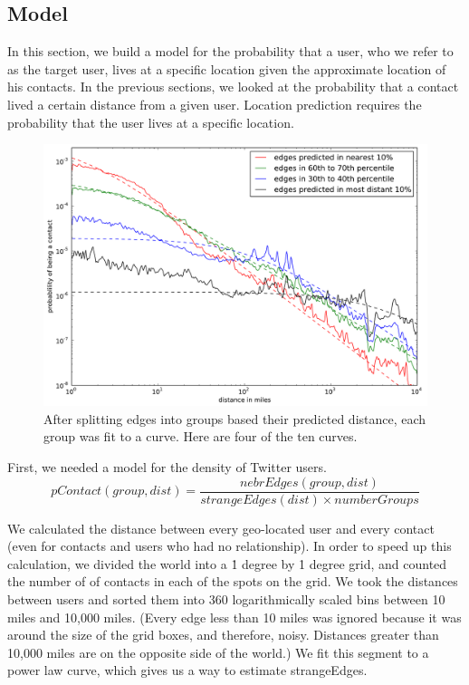 \subsection{Model}
\label{sec:model}

In this section, we build a model for the probability that a user, who we refer
to as the target user, lives at a specific location given the approximate
location of his contacts.
%
In the previous sections, we looked at the probability that a contact lived a
certain distance from a given user.
%
Location prediction requires the probability that the user lives at a specific
location.


\begin{figure}[tb]
\centering
\includegraphics[width=\linewidth]{figures/near_prob_fit.pdf}
\caption{
After splitting edges into groups based their predicted distance, each group was fit to a curve. Here are four of the ten curves.
}
\label{fig:NearProbFit}
\end{figure}

First, we needed a model for the density of Twitter users.
\[
    pContact(group,dist) = \frac{nebrEdges(group,dist)}{strangeEdges(dist) \times numberGroups}
\]

We calculated the distance between every geo-located user and every contact
(even for contacts and users who had no relationship).
%
In order to speed up this calculation, we divided the world into a \.1 degree
by \.1 degree grid, and counted the number of of contacts in each of the spots
on the grid.
%
We took the distances between users and sorted them into 360 logarithmically
scaled bins between 10 miles and 10,000 miles.
%
(Every edge less than 10 miles was ignored because it was around the size of
the grid boxes, and therefore, noisy. Distances greater than 10,000 miles are
on the opposite side of the world.)
%
We fit this segment to a power law curve, which gives us a way to estimate
strangeEdges.


